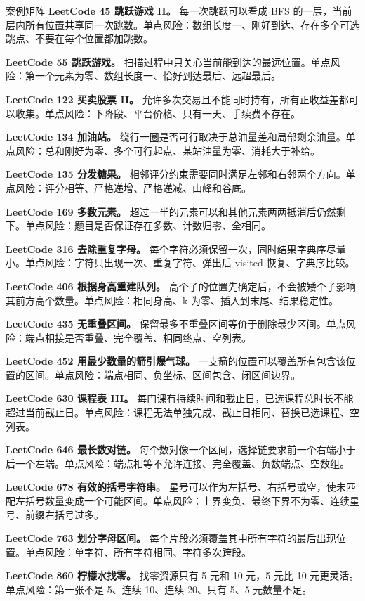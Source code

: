 \begin{principlebox}{案例矩阵}
\textbf{LeetCode 45 跳跃游戏 II。}
每一次跳跃可以看成 BFS 的一层，当前层内所有位置共享同一次跳数。单点风险：数组长度一、刚好到达、存在多个可选跳点、不要在每个位置都加跳数。

\textbf{LeetCode 55 跳跃游戏。}
扫描过程中只关心当前能到达的最远位置。单点风险：第一个元素为零、数组长度一、恰好到达最后、远超最后。

\textbf{LeetCode 122 买卖股票 II。}
允许多次交易且不能同时持有，所有正收益差都可以收集。单点风险：下降段、平台价格、只有一天、手续费不存在。

\textbf{LeetCode 134 加油站。}
绕行一圈是否可行取决于总油量差和局部剩余油量。单点风险：总和刚好为零、多个可行起点、某站油量为零、消耗大于补给。

\textbf{LeetCode 135 分发糖果。}
相邻评分约束需要同时满足左邻和右邻两个方向。单点风险：评分相等、严格递增、严格递减、山峰和谷底。

\textbf{LeetCode 169 多数元素。}
超过一半的元素可以和其他元素两两抵消后仍然剩下。单点风险：题目是否保证存在多数、计数归零、全相同。

\textbf{LeetCode 316 去除重复字母。}
每个字符必须保留一次，同时结果字典序尽量小。单点风险：字符只出现一次、重复字符、弹出后 visited 恢复、字典序比较。

\textbf{LeetCode 406 根据身高重建队列。}
高个子的位置先确定后，不会被矮个子影响其前方高个数量。单点风险：相同身高、k 为零、插入到末尾、结果稳定性。

\textbf{LeetCode 435 无重叠区间。}
保留最多不重叠区间等价于删除最少区间。单点风险：端点相接是否重叠、完全覆盖、相同终点、空列表。

\textbf{LeetCode 452 用最少数量的箭引爆气球。}
一支箭的位置可以覆盖所有包含该位置的区间。单点风险：端点相同、负坐标、区间包含、闭区间边界。

\textbf{LeetCode 630 课程表 III。}
每门课有持续时间和截止日，已选课程总时长不能超过当前截止日。单点风险：课程无法单独完成、截止日相同、替换已选课程、空列表。

\textbf{LeetCode 646 最长数对链。}
每个数对像一个区间，选择链要求前一个右端小于后一个左端。单点风险：端点相等不允许连接、完全覆盖、负数端点、空数组。

\textbf{LeetCode 678 有效的括号字符串。}
星号可以作为左括号、右括号或空，使未匹配左括号数量变成一个可能区间。单点风险：上界变负、最终下界不为零、连续星号、前缀右括号过多。

\textbf{LeetCode 763 划分字母区间。}
每个片段必须覆盖其中所有字符的最后出现位置。单点风险：单字符、所有字符相同、字符多次跨段。

\textbf{LeetCode 860 柠檬水找零。}
找零资源只有 5 元和 10 元，5 元比 10 元更灵活。单点风险：第一张不是 5、连续 10、连续 20、只有 5、5 元数量不足。

\end{principlebox}

